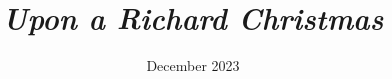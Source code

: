 \documentclass[12pt,a4paper]{article}
\title{\emph{\textbf{Upon a Richard Christmas}}}
\date{December 2023}
\begin{document}
    \maketitle
    \newpage
    \tableofcontents
    \newpage
    \begin{songs}{}
        
    \end{songs}
\end{document}
